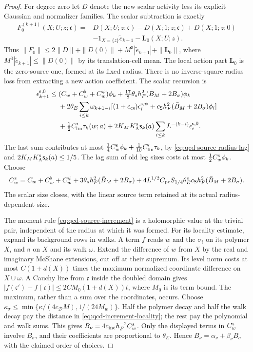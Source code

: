 \documentclass[11pt,letterpaper,reqno]{amsart}
\theoremstyle{definition}
\theoremstyle{remark}
\begin{document}
\begin{proof}
For degree zero let $D$ denote the new scalar activity
less its explicit Gaussian and normalizer families.
The scalar subtraction is exactly
\[
\begin{split}
 F_0^{(k+1)}(X;U;z;\mathfrak c)={}&D(X;U;z;\mathfrak c)
      -D(X;1;z;\mathfrak c)+D(X;1;z;0)\\
 &-1_{X=\{z\}}\widetilde e_{k+1}-\mathbf L_0(X;U;z).
\end{split}
\]
Thus $\|F_0\|\le2\|D\|+\|D(0)\|+
M^3|\widetilde e_{k+1}|+\|\mathbf L_0\|$, where
$M^3|\widetilde e_{k+1}|\le\|D(0)\|$ by its translation-cell
mean. The local action part $\mathbf L_0$ is the zero-source
one, formed at its fixed radius.
There is no inverse-square radius loss from extracting a
new action coefficient. The scalar recursion is
\[
\begin{split}
 \epsilon_{k+1}^{{\rm s},0}\le{}&
 (C_w+C_w^\flat+C_w^\psi)\phi_k
 +\tfrac{17}8\theta_sh_F^2(\bar B_M+2B_\sigma)\phi_k\\
 &+2\theta_E\sum_{i\le k}\omega_{k+1-i}
 [(1+c_{\rm cs})\epsilon_i^{{\rm s},\psi}
       +c_{\mathsf S}h_F^2(\bar B_M+2B_\sigma)\phi_i]\\
 &+\tfrac12C'_{\rm lin}\tau_k(w;a)
 +2K_MK_\Lambda^{\rm s}\mathsf s_k(a)
                     \sum_{i\le k}L^{-(k-i)}\epsilon_i^{{\rm s},0}.
\end{split}
\]
The last sum contributes at most
$\frac14C_w^{\rm s}\phi_k+
\tfrac1{10}C'_{\rm lin}\tau_k$,
by \eqref{eq:qcd-source-radius-lag} and
$2K_MK_\Lambda^{\rm s}\mathsf s_k(a)\le1/5$.
The lag sum of old leg sizes costs at most
$\frac12C_w^{\rm s}\phi_k$. Choose
\[
 C_w^{\rm s}=C_w+C_w^\flat+C_w^\psi+
 3\theta_sh_F^2(\bar B_M+2B_\sigma)+
 4L^{1/2}C_{\rm pc}S_{1/4}\theta_E^{\rm s}c_{\mathsf S}h_F^2
                                  (\bar B_M+2B_\sigma).
\]
The scalar size closes, with the linear source term retained
at its actual radius-dependent size.

The moment rule \eqref{eq:qcd-source-increment} is a
holomorphic value at the trivial pair, independent of the
radius at which it was formed. For its locality estimate,
expand its background rows in walks. A term $f$ reads $w$
and the $\sigma_i$ on its polymer $X$, and $\mathsf n$ on
$X$ and its walk $\omega$. Extend the difference of $w$
from $X$ by the real and imaginary McShane extensions,
cut off at their supremum. Its level norm costs at most
$C(1+d(X))$ times the maximum normalized coordinate
difference on $X\cup\omega$. A Cauchy line from
$\mathfrak c$ inside the doubled domain gives
$|f(\mathfrak c')-f(\mathfrak c)|\le
2CM_0(1+d(X))t$, where $M_0$ is its term bound.
The maximum, rather than a sum over the coordinates, occurs.
Choose
$\kappa_\sigma\le\min\{\kappa/(4c_{\mathcal D}M),1/(24M_w)\}$.
Half the polymer decay and half the walk decay pay the
distance in \eqref{eq:qcd-increment-locality}; the rest
pay the polynomial and walk sums. This gives
$B_\nu=4c_{\rm inc}h_F^{-2}C_w^{\rm s}$.
Only the displayed terms in $C_w^{\rm s}$ involve
$B_\sigma$, and their coefficients are proportional to
$\theta_E$. Hence $B_\nu=\alpha_\nu+\beta_\nu B_\sigma$
with the claimed order of choices.
\end{proof}
\end{document}
